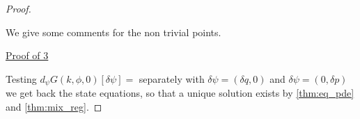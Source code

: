 \documentclass[english,a4paper,10pt,oneside]{scrbook}	%
\theoremstyle{break}
\newenvironment{mproof}[1][\proofname]{%
  \begin{proof}[#1]$ $\par\nobreak\ignorespaces
}{%
  \end{proof}
}
\renewcommand*{\proofname}{Proof}
\theoremstyle{remark}
\newcommand{\mR}{\mathbb{R}}
\newcommand{\norm}[1]{\left\lVert#1\right\rVert}
\newcommand{\tr}{\text{tr}}
\newcommand{\tw}[1]{\texttt{#1}}
\begin{document}
\begin{mproof}

We give some comments for the non trivial points.

%
%
%
%
%
%

\underline{Proof of 3}

Testing $d_\psi G(k,\phi,0)[\delta \psi]=$ separately with $\delta \psi =(\delta q, 0)$ and $\delta \psi = (0,\delta p)$ we get back the state equations, so that a unique solution exists by \cref{thm:eq_pde} and \cref{thm:mix_reg}.
%
%


\end{mproof}
\end{document}
